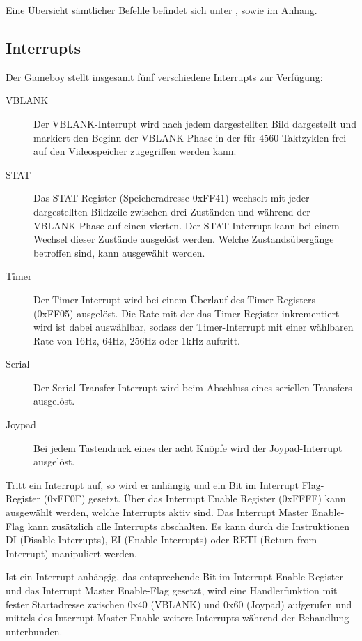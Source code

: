 \documentclass[a4paper]{scrartcl}
\begin{document}
Eine Übersicht sämtlicher Befehle befindet sich unter \cite{gameboy_opcodes}, sowie im Anhang.

\subsection{Interrupts}

Der Gameboy stellt insgesamt fünf verschiedene Interrupts zur Verfügung:

\begin{description}
\item[VBLANK]
Der VBLANK-Interrupt wird nach jedem dargestellten Bild dargestellt und markiert den Beginn der VBLANK-Phase in der für 4560 Taktzyklen frei auf den Videospeicher zugegriffen werden kann.
\item[STAT]
Das STAT-Register (Speicheradresse 0xFF41) wechselt mit jeder dargestellten Bildzeile zwischen drei Zuständen und während der VBLANK-Phase auf einen vierten. Der STAT-Interrupt kann bei einem Wechsel dieser Zustände ausgelöst werden. Welche Zustandsübergänge betroffen sind, kann ausgewählt werden.
\item[Timer]
Der Timer-Interrupt wird bei einem Überlauf des Timer-Registers (0xFF05) ausgelöst. Die Rate mit der das Timer-Register inkrementiert wird ist dabei auswählbar, sodass der Timer-Interrupt mit einer wählbaren Rate von 16Hz, 64Hz, 256Hz oder 1kHz auftritt.
\item[Serial]
Der Serial Transfer-Interrupt wird beim Abschluss eines seriellen Transfers ausgelöst.
\item[Joypad]
Bei jedem Tastendruck eines der acht Knöpfe wird der Joypad-Interrupt ausgelöst.
\end{description}

Tritt ein Interrupt auf, so wird er anhängig und ein Bit im Interrupt Flag-Register (0xFF0F) gesetzt.
Über das Interrupt Enable Register (0xFFFF) kann ausgewählt werden, welche Interrupts aktiv sind.
Das Interrupt Master Enable-Flag kann zusätzlich alle Interrupts abschalten. Es kann durch die Instruktionen DI (Disable Interrupts), EI (Enable Interrupts) oder RETI (Return from Interrupt) manipuliert werden.

Ist ein Interrupt anhängig, das entsprechende Bit im Interrupt Enable Register und das Interrupt Master Enable-Flag gesetzt, wird eine Handlerfunktion mit fester Startadresse zwischen 0x40 (VBLANK) und 0x60 (Joypad) aufgerufen und mittels des Interrupt Master Enable weitere Interrupts während der Behandlung unterbunden.
\end{document}

